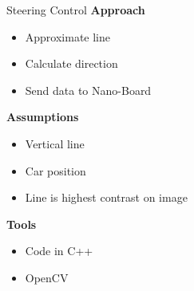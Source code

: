 \begin{frame}[plain]{Steering Control}
	\large 
	\textbf{Approach}
	\begin{itemize}
		\item Approximate line
		\item Calculate direction
		\item Send data to Nano-Board
	\end{itemize}
	\pause
	\textbf{Assumptions}
	\begin{itemize}
		\item Vertical line
		\item Car position
		\item Line is highest contrast on image
	\end{itemize}
	\pause
	\textbf{Tools}
	\begin{itemize}
		\item Code in C++
		\item OpenCV
	\end{itemize}
\end{frame}

